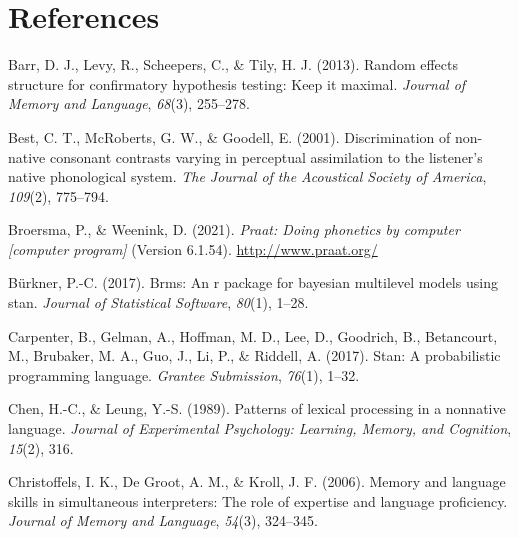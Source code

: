 \documentclass[
  english,
  man,floatsintext]{apa7}
\newlength{\cslhangindent}
\newenvironment{CSLReferences}[2] %
 {%
  \setlength{\parindent}{0pt}
  \ifodd #1 \everypar{\setlength{\hangindent}{\cslhangindent}}\ignorespaces\fi
  \ifnum #2 > 0
  \setlength{\parskip}{#2\baselineskip}
  \fi
 }%
 {}
\begin{document}
\newpage

\hypertarget{references}{%
\section{References}\label{references}}

\begingroup
\setlength{\parindent}{-0.5in}
\setlength{\leftskip}{0.5in}

\hypertarget{refs}{}
\begin{CSLReferences}{1}{0}
\leavevmode{}%
Barr, D. J., Levy, R., Scheepers, C., \& Tily, H. J. (2013). Random effects structure for confirmatory hypothesis testing: Keep it maximal. \emph{Journal of Memory and Language}, \emph{68}(3), 255--278.

\leavevmode{}%
Best, C. T., McRoberts, G. W., \& Goodell, E. (2001). Discrimination of non-native consonant contrasts varying in perceptual assimilation to the listener's native phonological system. \emph{The Journal of the Acoustical Society of America}, \emph{109}(2), 775--794.

\leavevmode{}%
Broersma, P., \& Weenink, D. (2021). \emph{Praat: Doing phonetics by computer {[}computer program{]}} (Version 6.1.54). \url{http://www.praat.org/}

\leavevmode{}%
Bürkner, P.-C. (2017). Brms: An r package for bayesian multilevel models using stan. \emph{Journal of Statistical Software}, \emph{80}(1), 1--28.

\leavevmode{}%
Carpenter, B., Gelman, A., Hoffman, M. D., Lee, D., Goodrich, B., Betancourt, M., Brubaker, M. A., Guo, J., Li, P., \& Riddell, A. (2017). Stan: A probabilistic programming language. \emph{Grantee Submission}, \emph{76}(1), 1--32.

\leavevmode{}%
Chen, H.-C., \& Leung, Y.-S. (1989). Patterns of lexical processing in a nonnative language. \emph{Journal of Experimental Psychology: Learning, Memory, and Cognition}, \emph{15}(2), 316.

\leavevmode{}%
Christoffels, I. K., De Groot, A. M., \& Kroll, J. F. (2006). Memory and language skills in simultaneous interpreters: The role of expertise and language proficiency. \emph{Journal of Memory and Language}, \emph{54}(3), 324--345.


\end{CSLReferences}
\end{document}

